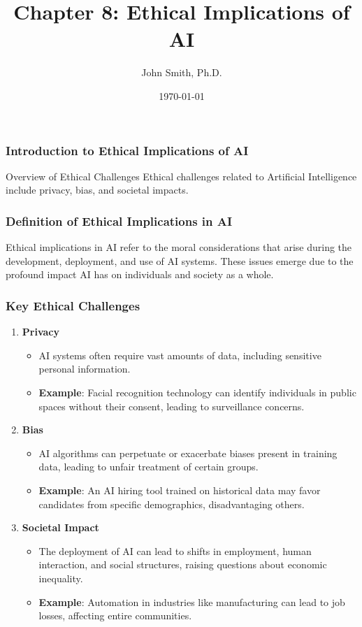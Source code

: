\documentclass[aspectratio=169]{beamer}
\title[Chapter 8: Ethical Implications of AI]{Chapter 8: Ethical Implications of AI}
\author[J. Smith]{John Smith, Ph.D.}
\institute[University Name]{
  Department of Computer Science\\
  University Name\\
  \vspace{0.3cm}
  Email: email@university.edu\\
  Website: www.university.edu
}
\date{\today}
\begin{document}
\frame{\titlepage}

\begin{frame}[fragile]
    \titlepage
\end{frame}

\begin{frame}[fragile]
    \frametitle{Introduction to Ethical Implications of AI}
    \begin{block}{Overview of Ethical Challenges}
        Ethical challenges related to Artificial Intelligence include privacy, bias, and societal impacts.
    \end{block}
\end{frame}

\begin{frame}[fragile]
    \frametitle{Definition of Ethical Implications in AI}
    Ethical implications in AI refer to the moral considerations that arise during the development, deployment, and use of AI systems. 
    These issues emerge due to the profound impact AI has on individuals and society as a whole.
\end{frame}

\begin{frame}[fragile]
    \frametitle{Key Ethical Challenges}
    \begin{enumerate}
        \item \textbf{Privacy}
        \begin{itemize}
            \item AI systems often require vast amounts of data, including sensitive personal information.
            \item \textbf{Example}: Facial recognition technology can identify individuals in public spaces without their consent, leading to surveillance concerns.
        \end{itemize}
        
        \item \textbf{Bias}
        \begin{itemize}
            \item AI algorithms can perpetuate or exacerbate biases present in training data, leading to unfair treatment of certain groups.
            \item \textbf{Example}: An AI hiring tool trained on historical data may favor candidates from specific demographics, disadvantaging others.
        \end{itemize}
        
        \item \textbf{Societal Impact}
        \begin{itemize}
            \item The deployment of AI can lead to shifts in employment, human interaction, and social structures, raising questions about economic inequality.
            \item \textbf{Example}: Automation in industries like manufacturing can lead to job losses, affecting entire communities.
        \end{itemize}
    \end{enumerate}
\end{frame}
\end{document}
